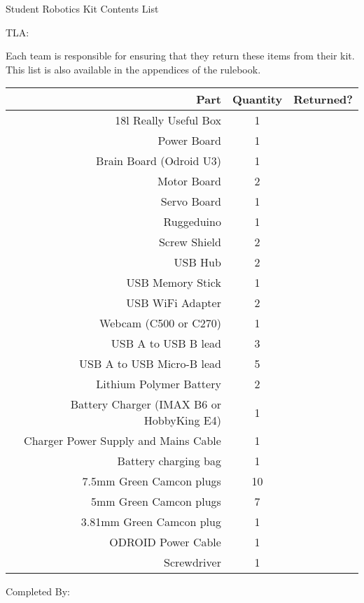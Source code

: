 \documentclass[a4paper, 12pt]{article}
\begin{document}
\begin{center}

    {\huge{Student Robotics Kit Contents List}}

    \medskip

\end{center}

TLA: \hrulefill

\medskip

Each team is responsible for ensuring that they return these items from their kit. This list is also available in the appendices of the rulebook.

\begin{center}
\begin{table}[h]
\def\arraystretch{1.5}
\begin{tabularx}{\textwidth}{|r|c|X|}
\hline
    \textbf{Part} & \textbf{Quantity} & \textbf{Returned?} \\
\hline
 18l Really Useful Box & 1 & \\ \hline

 Power Board & 1 & \\ \hline
 Brain Board (Odroid U3) & 1 & \\ \hline
 Motor Board & 2 & \\ \hline
 Servo Board & 1 & \\ \hline
 Ruggeduino & 1 & \\ \hline
 Screw Shield & 2 & \\ \hline

 USB Hub & 2 & \\ \hline
 USB Memory Stick & 1 & \\ \hline
 USB WiFi Adapter & 2 & \\ \hline
 Webcam (C500 or C270) & 1 & \\ \hline
 USB A to USB B lead & 3 & \\ \hline
 USB A to USB Micro-B lead & 5 & \\ \hline

 Lithium Polymer Battery & 2 & \\ \hline
 Battery Charger (IMAX B6 or HobbyKing E4) & 1 & \\ \hline
 Charger Power Supply and Mains Cable & 1 & \\ \hline
 Battery charging bag & 1 & \\ \hline

 7.5mm Green Camcon plugs & 10 & \\ \hline
 5mm Green Camcon plugs & 7 & \\ \hline
 3.81mm Green Camcon plug & 1 & \\ \hline
 ODROID Power Cable & 1 & \\ \hline
Screwdriver & 1 & \\ \hline
\end{tabularx}
\end{table}
\end{center}

Completed By: \hrulefill
\end{document}

